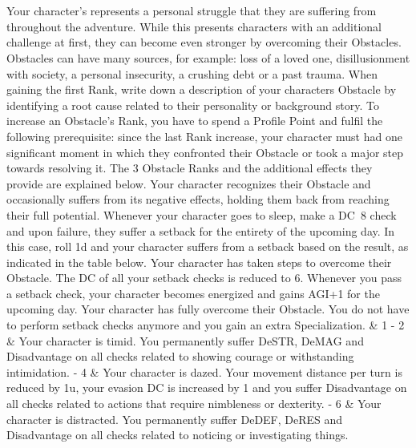 \documentclass[a4paper, titlepage, 11pt, twocolumn] {article}
\begin{document}
%
\newpage
%
\\\\
%
Your character's  represents a personal struggle that they are suffering from throughout the adventure.
While this presents characters with an additional challenge at first, they can become even stronger by overcoming their Obstacles.
Obstacles can have many sources, for example: loss of a loved one, disillusionment with society, a personal insecurity, a crushing debt or a past trauma.
When gaining the first Rank, write down a description of your characters Obstacle by identifying a root cause related to their personality or background story.
To increase an Obstacle's Rank, you have to spend a Profile Point and fulfil the following prerequisite: since the last Rank increase, your character must had one significant moment in which they confronted their Obstacle or took a major step towards resolving it.
The 3 Obstacle Ranks and the additional effects they provide are explained below.
%
\vfill
%
 Your character recognizes their Obstacle and occasionally suffers from its negative effects, holding them back from reaching their full potential. Whenever your character goes to sleep, make a DC~8 check and upon failure, they suffer a setback for the entirety of the upcoming day. In this case, roll 1d and your character suffers from a setback based on the result, as indicated in the table below. \ofrow
{} Your character has taken steps to overcome their Obstacle. The DC of all your setback checks is reduced to 6. Whenever you pass a setback check, your character becomes energized and gains AGI+1 for the upcoming day.\ofrow
{} Your character has fully overcome their Obstacle. You do not have to perform setback checks anymore and you gain an extra Specialization.
%
\vfill
%
{ & }
{
	1 - 2 & Your character is timid. You permanently suffer DeSTR, DeMAG and Disadvantage on all checks related to showing courage or withstanding intimidation.  - 4 & Your character is dazed. Your movement distance per turn is reduced by 1u, your evasion DC is increased by 1 and you suffer Disadvantage on all checks related to actions that require nimbleness or dexterity. - 6 & Your character is distracted. You permanently suffer DeDEF, DeRES and Disadvantage on all checks related to noticing or investigating things. \ofrow
}
\end{document}
